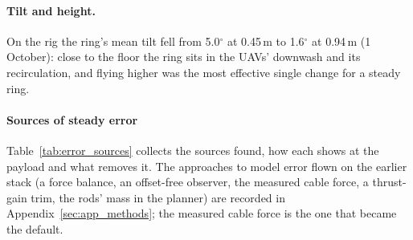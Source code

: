 \paragraph{Tilt and height.} On the rig the ring's mean tilt fell from 5.0$^\circ$ at 0.45\,m to 1.6$^\circ$ at
0.94\,m (1 October): close to the floor the ring sits in the UAVs' downwash and its recirculation, and flying higher
was the most effective single change for a steady ring.

\paragraph{Sources of steady error}

Table~\ref{tab:error_sources} collects the sources found, how each shows at the payload and what removes it. The
approaches to model error flown on the earlier stack (a force balance, an offset-free observer, the measured cable
force, a thrust-gain trim, the rods' mass in the planner) are recorded in Appendix~\ref{sec:app_methods}; the measured
cable force is the one that became the default.

